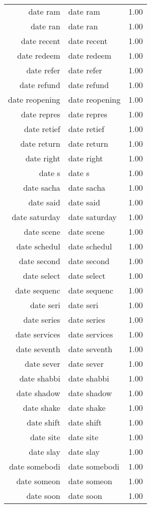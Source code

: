 \begin{table}[ht]
\begin{tabular}{rlr}
  date ram & date ram & 1.00 \\ 
  date ran & date ran & 1.00 \\ 
  date recent & date recent & 1.00 \\ 
  date redeem & date redeem & 1.00 \\ 
  date refer & date refer & 1.00 \\ 
  date refund & date refund & 1.00 \\ 
  date reopening & date reopening & 1.00 \\ 
  date repres & date repres & 1.00 \\ 
  date retief & date retief & 1.00 \\ 
  date return & date return & 1.00 \\ 
  date right & date right & 1.00 \\ 
  date s & date s & 1.00 \\ 
  date sacha & date sacha & 1.00 \\ 
  date said & date said & 1.00 \\ 
  date saturday & date saturday & 1.00 \\ 
  date scene & date scene & 1.00 \\ 
  date schedul & date schedul & 1.00 \\ 
  date second & date second & 1.00 \\ 
  date select & date select & 1.00 \\ 
  date sequenc & date sequenc & 1.00 \\ 
  date seri & date seri & 1.00 \\ 
  date series & date series & 1.00 \\ 
  date services & date services & 1.00 \\ 
  date seventh & date seventh & 1.00 \\ 
  date sever & date sever & 1.00 \\ 
  date shabbi & date shabbi & 1.00 \\ 
  date shadow & date shadow & 1.00 \\ 
  date shake & date shake & 1.00 \\ 
  date shift & date shift & 1.00 \\ 
  date site & date site & 1.00 \\ 
  date slay & date slay & 1.00 \\ 
  date somebodi & date somebodi & 1.00 \\ 
  date someon & date someon & 1.00 \\ 
  date soon & date soon & 1.00 \\ 

\end{tabular}
\end{table}
